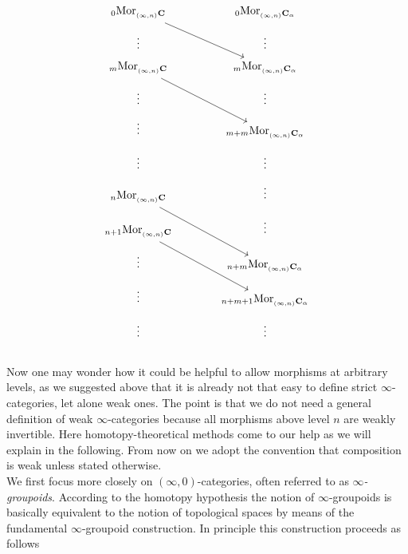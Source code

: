 \begin{equation*}
\begin{tikzcd}[row sep=tiny,column sep=large]
  {_{0}}\mathrm{Mor}_{{_{(\infty,n)}}\mathbf{C}}
  \arrow{rdd}{}
  &
  {_{0}}\mathrm{Mor}_{{_{(\infty,n)}}\mathbf{C}_{\alpha}}
  \\
  \vdots
  &
  \vdots
  \\
  {_{m}}\mathrm{Mor}_{{_{(\infty,n)}}\mathbf{C}}
  \arrow{rdd}{}
  &
  {_{m}}\mathrm{Mor}_{{_{(\infty,n)}}\mathbf{C}_{\alpha}}
  \\
  \vdots
  &
  \vdots
  \\
  \vdots
  &
  {_{m+m}}\mathrm{Mor}_{{_{(\infty,n)}}\mathbf{C}_{\alpha}}
  \\
  \vdots
  &
  \vdots
  \\
  {_{n}}\mathrm{Mor}_{{_{(\infty,n)}}\mathbf{C}}
  \arrow{rdd}{}
  &
  \vdots
  \\
  {_{n+1}}\mathrm{Mor}_{{_{(\infty,n)}}\mathbf{C}}
  \arrow{rdd}{}
  &
  \vdots
  \\
  \vdots
  &
  {_{n+m}}\mathrm{Mor}_{{_{(\infty,n)}}\mathbf{C}_{\alpha}}
  \\
  \vdots
  &
  {_{n+m+1}}\mathrm{Mor}_{{_{(\infty,n)}}\mathbf{C}_{\alpha}}
  \\
  \vdots
  &
  \vdots
\end{tikzcd}
\end{equation*}
\\
Now one may wonder how it could be helpful to allow morphisms at arbitrary levels, as we suggested above that it is already not that easy to define strict $\infty$-categories, let alone weak ones. The point is that we do not need a general definition of weak $\infty$-categories because all morphisms above level $n$ are weakly invertible. Here homotopy-theoretical methods come to our help as we will explain in the following. From now on we adopt the convention that composition is weak unless stated otherwise.
\\
We first focus more closely on $(\infty,0)$-categories, often referred to as \textit{$\infty$-groupoids}. According to the homotopy hypothesis the notion of $\infty$-groupoids is basically equivalent to the notion of topological spaces by means of the fundamental $\infty$-groupoid construction. In principle this construction proceeds as follows
\\
